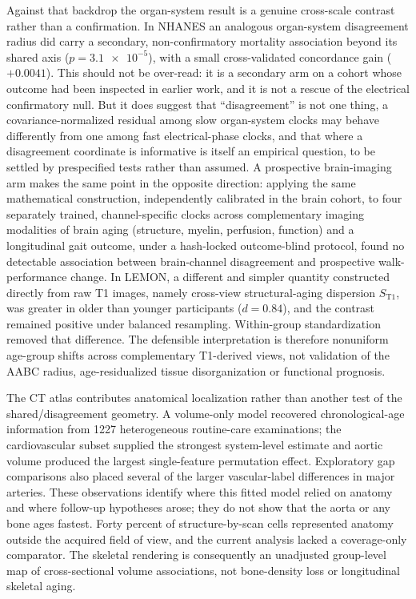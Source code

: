 \documentclass[11pt]{article}
\begin{document}
Against that backdrop the organ-system result is a genuine cross-scale
contrast rather than a confirmation. In NHANES an analogous organ-system disagreement
radius did carry a secondary, non-confirmatory mortality association beyond its shared
axis ($p=\num{3.1e-5}$), with a small cross-validated concordance gain
($+\num{0.0041}$). This should not be over-read: it is a secondary arm on a cohort whose
outcome had been inspected in earlier work, and it is not a rescue of the electrical
confirmatory null. But it does suggest that ``disagreement'' is not one thing, a
covariance-normalized residual among slow organ-system clocks may behave differently
from one among fast electrical-phase clocks, and that where a disagreement coordinate is
informative is itself an empirical question, to be settled by prespecified tests rather
than assumed. A prospective brain-imaging arm makes the same point in the opposite
direction: applying the same mathematical construction, independently calibrated
in the brain cohort, to four
separately trained, channel-specific clocks across complementary imaging modalities of brain aging
(structure, myelin, perfusion, function) and a longitudinal gait outcome, under a
hash-locked outcome-blind protocol, found no detectable association between
brain-channel disagreement and prospective walk-performance change. In LEMON,
a different and simpler quantity constructed directly from raw T1 images, namely cross-view
structural-aging dispersion $S_{\mathrm{T1}}$, was greater in older than younger
participants ($d=\num{0.84}$), and the contrast remained positive under balanced
resampling. Within-group standardization removed that difference. The defensible
interpretation is therefore nonuniform age-group shifts across complementary
T1-derived views, not validation of the AABC radius, age-residualized tissue
disorganization or functional prognosis.

The CT atlas contributes anatomical localization rather than another test of
the shared/disagreement geometry. A volume-only model recovered chronological-age
information from \num{1227} heterogeneous routine-care examinations; the
cardiovascular subset supplied the strongest system-level estimate and aortic
volume produced the largest single-feature permutation effect. Exploratory gap
comparisons also placed several of the larger vascular-label differences in
major arteries. These observations identify where this fitted model relied on
anatomy and where follow-up hypotheses arose; they do not show that the aorta or
any bone ages fastest. Forty percent of structure-by-scan cells represented
anatomy outside the acquired field of view, and the current analysis lacked a
coverage-only comparator. The skeletal rendering is consequently an unadjusted
group-level map of cross-sectional volume associations, not bone-density loss or
longitudinal skeletal aging.
\end{document}
